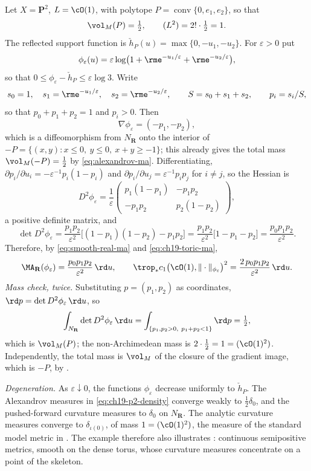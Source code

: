 \begin{example}
\label{ex:ch19-toric-p2-smooth}
Let $X=\mathbf P^2$, $L=\cO(1)$, with polytope
$P=\operatorname{conv}\{0,e_1,e_2\}$, so that
\[
 \vol_M(P)=\tfrac12,
 \qquad
 (L^2)=2!\cdot\tfrac12=1 .
\]
The reflected support function is
$\check h_P(u)=\max\{0,-u_1,-u_2\}$.  For $\varepsilon>0$ put
\[
 \phi_\varepsilon(u)
 =\varepsilon\log\bigl(1+\rme^{-u_1/\varepsilon}+\rme^{-u_2/\varepsilon}\bigr),
\]
so that $0\leq\phi_\varepsilon-\check h_P\leq\varepsilon\log3$.  Write
\[
 s_0=1,\quad s_1=\rme^{-u_1/\varepsilon},\quad s_2=\rme^{-u_2/\varepsilon},
 \qquad S=s_0+s_1+s_2,\qquad p_i=s_i/S ,
\]
so that $p_0+p_1+p_2=1$ and $p_i>0$.  Then
\[
 \nabla\phi_\varepsilon=(-p_1,-p_2),
\]
which is a diffeomorphism from $N_{\mathbf R}$ onto the interior of
$-P=\{(x,y):x\leq0,\ y\leq0,\ x+y\geq-1\}$; this already gives the total
mass $\vol_M(-P)=\tfrac12$ by \eqref{eq:alexandrov-ma}.  Differentiating,
$\partial p_i/\partial u_i=-\varepsilon^{-1}p_i(1-p_i)$ and
$\partial p_i/\partial u_j=\varepsilon^{-1}p_ip_j$ for $i\neq j$, so the
Hessian is
\[
 D^2\phi_\varepsilon
 =\frac1\varepsilon
   \begin{pmatrix}
     p_1(1-p_1) & -p_1p_2\\
     -p_1p_2    & p_2(1-p_2)
   \end{pmatrix},
\]
a positive definite matrix, and
\[
 \det D^2\phi_\varepsilon
 =\frac{p_1p_2}{\varepsilon^2}
   \bigl[(1-p_1)(1-p_2)-p_1p_2\bigr]
 =\frac{p_1p_2}{\varepsilon^2}\bigl[1-p_1-p_2\bigr]
 =\frac{p_0p_1p_2}{\varepsilon^2}.
\]
Therefore, by \eqref{eq:smooth-real-ma} and \eqref{eq:ch19-toric-ma},
\begin{equation}
\label{eq:ch19-p2-density}
 \MA_{\mathbf R}(\phi_\varepsilon)
 =\frac{p_0p_1p_2}{\varepsilon^2}\,\rd u,
 \qquad
 \trop_*c_1\bigl(\cO(1),\|\cdot\|_{\phi_\varepsilon}\bigr)^2
 =\frac{2\,p_0p_1p_2}{\varepsilon^2}\,\rd u .
\end{equation}
\emph{Mass check, twice.}  Substituting $p=(p_1,p_2)$ as coordinates,
$\rd p=\det D^2\phi_\varepsilon\,\rd u$, so
\[
 \int_{N_{\mathbf R}}\det D^2\phi_\varepsilon\,\rd u
 =\int_{\{p_1,p_2>0,\ p_1+p_2<1\}}\rd p=\tfrac12 ,
\]
which is $\vol_M(P)$; the non-Archimedean mass is
$2\cdot\tfrac12=1=(\cO(1)^2)$.  Independently, the total mass is
$\vol_M$ of the closure of the gradient image, which is $-P$, by
.

\emph{Degeneration.}  As $\varepsilon\downarrow0$, the functions
$\phi_\varepsilon$ decrease uniformly to $\check h_P$.
The Alexandrov measures in \eqref{eq:ch19-p2-density} converge weakly to
$\tfrac12\delta_0$, and the pushed-forward curvature measures to $\delta_0$
on $N_{\mathbf R}$.  The analytic curvature measures converge to
$\delta_{\iota(0)}$, of mass $1=(\cO(1)^2)$, the measure of the standard
model metric in .  The example therefore also
illustrates : continuous semipositive metrics,
smooth on the dense torus,
whose curvature measures concentrate on a point of the skeleton.
\end{example}

